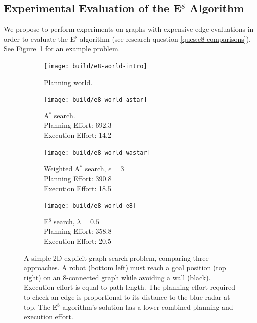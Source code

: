 \subsection{Experimental Evaluation of the E$^8$ Algorithm}

We propose to perform experiments on graphs with
expensive edge evaluations
in order to evaluate the E$^8$ algorithm
(see research question \ref{ques:e8-comparisons}).
See Figure~\ref{fig:e8-results} for an example problem.

\begin{figure}
   \centering
   
   
   
   \begin{subfigure}[t]{0.47\textwidth}
      \centering
      \texttt{[image: build/e8-world-intro]}
      \caption{Planning world.}
   \end{subfigure}%
   \quad%
   \begin{subfigure}[t]{0.47\textwidth}
      \centering
      \texttt{[image: build/e8-world-astar]}
      \caption{A$^*$ search.\\
         Planning Effort: 692.3 \\%
         Execution Effort: 14.2 }%
   \end{subfigure}%
   
   \vspace{0.05in}
   
   \begin{subfigure}[t]{0.47\textwidth}
      \centering
      \texttt{[image: build/e8-world-wastar]}
      \caption{Weighted A$^*$ search, $\epsilon=3$\\
         Planning Effort: 390.8 \\%
         Execution Effort: 18.5 }%
   \end{subfigure}%
   \quad%
   \begin{subfigure}[t]{0.47\textwidth}
      \centering
      \texttt{[image: build/e8-world-e8]}
      \caption{E$^8$ search, $\lambda=0.5$\\
         Planning Effort: 358.8 \\%
         Execution Effort: 20.5 }%
   \end{subfigure}
   \caption{A simple 2D explicit graph search problem,
      comparing three approaches.
      A robot (bottom left) must reach a goal position (top right)
      on an 8-connected graph
      while avoiding a wall (black).
      Execution effort is equal to path length.
      The planning effort required to check an edge is proportional
      to its distance to the blue radar at top.
      The E$^8$ algorithm's solution has a lower combined
      planning and execution effort.}
   \label{fig:e8-results}
\end{figure}

